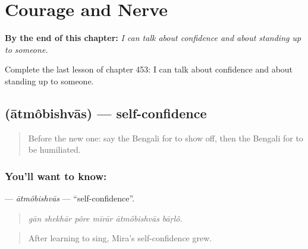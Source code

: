 
\chapter{Courage and Nerve}
\label{ch:bn-courage-and-nerve}

\begin{chapteropening}
\textbf{By the end of this chapter:} \emph{I can talk about confidence and about standing up to someone.}

Complete the last lesson of chapter 453: I can talk about confidence and about standing up to someone.
\end{chapteropening}

\section[\texorpdfstring{\bn{আত্মবিশ্বাস} (ātmôbishvās)}{আত্মবিশ্বাস (ātmôbishvās)}]{ (ātmôbishvās) — self-confidence}

\label{lesson:BN-C453-atmobishvas}



\begin{quote}
Before the new one: say the Bengali for to show off, then the Bengali for to be humiliated.
\end{quote}

\subsection*{You'll want to know: }
\textbf{} — \emph{ātmôbishvās} — \textquotedblleft{}self-confidence\textquotedblright{}.

\begin{quote}
     
\end{quote}

\begin{quote}
\emph{gān shekhār pôre mīrār ātmôbishvās bāṛlô.}
\end{quote}

\begin{quote}
After learning to sing, Mira's self-confidence grew.
\end{quote}

